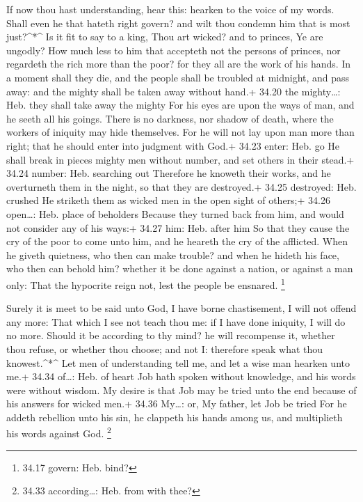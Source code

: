  If now thou hast understanding, hear this: hearken to the
voice of my words.  Shall even he that hateth right govern?
and wilt thou condemn him that is most just?\^{}*\^{}  Is
it fit to say to a king, Thou art wicked? and to princes, Ye are
ungodly?  How much less to him that accepteth not the
persons of princes, nor regardeth the rich more than the poor? for they
all are the work of his hands.  In a moment shall they die,
and the people shall be troubled at midnight, and pass away: and the
mighty shall be taken away without hand.+ 34.20 the mighty\ldots: Heb.
they shall take away the mighty  For his eyes are upon the
ways of man, and he seeth all his goings.  There is no
darkness, nor shadow of death, where the workers of iniquity may hide
themselves.  For he will not lay upon man more than right;
that he should enter into judgment with God.+ 34.23 enter: Heb. go
 He shall break in pieces mighty men without number, and
set others in their stead.+ 34.24 number: Heb. searching out
 Therefore he knoweth their works, and he overturneth them
in the night, so that they are destroyed.+ 34.25 destroyed: Heb. crushed
 He striketh them as wicked men in the open sight of
others;+ 34.26 open\ldots: Heb. place of beholders  Because
they turned back from him, and would not consider any of his ways:+
34.27 him: Heb. after him  So that they cause the cry of
the poor to come unto him, and he heareth the cry of the afflicted.
 When he giveth quietness, who then can make trouble? and
when he hideth his face, who then can behold him? whether it be done
against a nation, or against a man only:  That the
hypocrite reign not, lest the people be ensnared. \footnote{34.17
  govern: Heb. bind?}

 Surely it is meet to be said unto God, I have borne
chastisement, I will not offend any more:  That which I see
not teach thou me: if I have done iniquity, I will do no more.
 Should it be according to thy mind? he will recompense it,
whether thou refuse, or whether thou choose; and not I: therefore speak
what thou knowest.\^{}*\^{}  Let men of understanding tell
me, and let a wise man hearken unto me.+ 34.34 of\ldots: Heb. of heart
 Job hath spoken without knowledge, and his words were
without wisdom.  My desire is that Job may be tried unto
the end because of his answers for wicked men.+ 34.36 My\ldots: or, My
father, let Job be tried  For he addeth rebellion unto his
sin, he clappeth his hands among us, and multiplieth his words against
God. \footnote{34.33 according\ldots: Heb. from with thee?}

